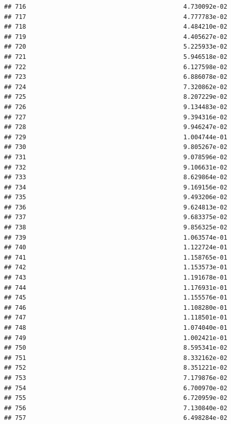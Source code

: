 \documentclass[
]{article}
\begin{document}
\begin{verbatim}
## 716                                           4.730092e-02
## 717                                           4.777783e-02
## 718                                           4.484210e-02
## 719                                           4.405627e-02
## 720                                           5.225933e-02
## 721                                           5.946518e-02
## 722                                           6.127598e-02
## 723                                           6.886078e-02
## 724                                           7.320862e-02
## 725                                           8.207229e-02
## 726                                           9.134483e-02
## 727                                           9.394316e-02
## 728                                           9.946247e-02
## 729                                           1.004744e-01
## 730                                           9.805267e-02
## 731                                           9.078596e-02
## 732                                           9.106631e-02
## 733                                           8.629864e-02
## 734                                           9.169156e-02
## 735                                           9.493206e-02
## 736                                           9.624813e-02
## 737                                           9.683375e-02
## 738                                           9.856325e-02
## 739                                           1.063574e-01
## 740                                           1.122724e-01
## 741                                           1.158765e-01
## 742                                           1.153573e-01
## 743                                           1.191678e-01
## 744                                           1.176931e-01
## 745                                           1.155576e-01
## 746                                           1.108280e-01
## 747                                           1.118501e-01
## 748                                           1.074040e-01
## 749                                           1.002421e-01
## 750                                           8.595341e-02
## 751                                           8.332162e-02
## 752                                           8.351221e-02
## 753                                           7.179876e-02
## 754                                           6.700970e-02
## 755                                           6.720959e-02
## 756                                           7.130840e-02
## 757                                           6.498284e-02

\end{verbatim}
\end{document}
